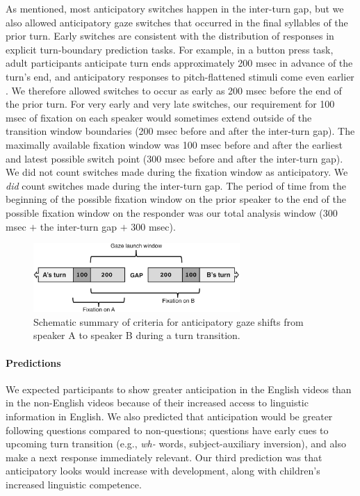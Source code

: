 \documentclass[authoryear, 12pt]{elsarticle}
\begin{document}
As mentioned, most anticipatory switches happen in the inter-turn gap, but we also allowed anticipatory gaze switches that occurred in the final syllables of the prior turn. Early switches are consistent with the distribution of responses in explicit turn-boundary prediction tasks. For example, in a button press task, adult participants anticipate turn ends approximately 200 msec in advance of the turn's end, and anticipatory responses to pitch-flattened stimuli come even earlier \citep{de-ruiter2006}. We therefore allowed switches to occur as early as 200 msec before the end of the prior turn. For very early and very late switches, our requirement for 100 msec of fixation on each speaker would sometimes extend outside of the transition window boundaries (200 msec before and after the inter-turn gap). The maximally available fixation window was 100 msec before and after the earliest and latest possible switch point (300 msec before and after the inter-turn gap). We did not count switches made during the fixation window as anticipatory. We \textit{did} count switches made during the inter-turn gap. The period of time from the beginning of the possible fixation window on the prior speaker to the end of the possible fixation window on the responder was our total analysis window (300 msec $+$ the inter-turn gap $+$ 300 msec).

\begin{figure}[t]
\begin{center}
\includegraphics[width=0.7\textwidth]{figures/FIG-AnticipCriteria.png}
\end{center}
\caption{Schematic summary of criteria for anticipatory gaze shifts from speaker A to speaker B during a turn transition.} 
\label{fig:criterion}
\end{figure}

\paragraph{Predictions}
We expected participants to show greater anticipation in the English videos than in the non-English videos because of their increased access to linguistic information in English. We also predicted that anticipation would be greater following questions compared to non-questions; questions have early cues to upcoming turn transition (e.g., \textit{wh-} words, subject-auxiliary inversion), and also make a next response immediately relevant. Our third prediction was that anticipatory looks would increase with development, along with children's increased linguistic competence.
\end{document}

